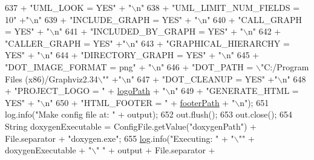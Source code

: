 \begin{DoxyCode}
637                     + \textcolor{stringliteral}{"UML\_LOOK = YES"} + \textcolor{stringliteral}{"\(\backslash\)n"}
638                     + \textcolor{stringliteral}{"UML\_LIMIT\_NUM\_FIELDS = 10"} +\textcolor{stringliteral}{"\(\backslash\)n"}
639                     + \textcolor{stringliteral}{"INCLUDE\_GRAPH = YES"} + \textcolor{stringliteral}{"\(\backslash\)n"}
640                     + \textcolor{stringliteral}{"CALL\_GRAPH = YES"} + \textcolor{stringliteral}{"\(\backslash\)n"}
641                     + \textcolor{stringliteral}{"INCLUDED\_BY\_GRAPH = YES"} + \textcolor{stringliteral}{"\(\backslash\)n"}
642                     + \textcolor{stringliteral}{"CALLER\_GRAPH = YES"} +\textcolor{stringliteral}{"\(\backslash\)n"}
643                     + \textcolor{stringliteral}{"GRAPHICAL\_HIERARCHY = YES"} + \textcolor{stringliteral}{"\(\backslash\)n"}
644                     + \textcolor{stringliteral}{"DIRECTORY\_GRAPH = YES"} + \textcolor{stringliteral}{"\(\backslash\)n"}
645                     + \textcolor{stringliteral}{"DOT\_IMAGE\_FORMAT = png"} + \textcolor{stringliteral}{"\(\backslash\)n"}
646                     + \textcolor{stringliteral}{"DOT\_PATH = \(\backslash\)"C:/Program Files (x86)/Graphviz2.34\(\backslash\)""} +\textcolor{stringliteral}{"\(\backslash\)n"}
647                     + \textcolor{stringliteral}{"DOT\_CLEANUP = YES"} +\textcolor{stringliteral}{"\(\backslash\)n"}
648                     + \textcolor{stringliteral}{"PROJECT\_LOGO = "} + \hyperlink{classit_1_1isislab_1_1masonassisteddocumentation_1_1mason_1_1analizer_1_1_global_utility_aeb806bda4a3b7b9099e2197bdca5cd75}{logoPath} + \textcolor{stringliteral}{"\(\backslash\)n"}
649                     + \textcolor{stringliteral}{"GENERATE\_HTML = YES"} + \textcolor{stringliteral}{"\(\backslash\)n"}
650                     + \textcolor{stringliteral}{"HTML\_FOOTER = "} + \hyperlink{classit_1_1isislab_1_1masonassisteddocumentation_1_1mason_1_1analizer_1_1_global_utility_ae94176856fb4ef24dfaa70423f5fc3f9}{footerPath} + \textcolor{stringliteral}{"\(\backslash\)n"});
651             log.info(\textcolor{stringliteral}{"Make config file at: "} + output);
652             out.flush();
653             out.close();
654             String doxygenExecutable = ConfigFile.getValue(\textcolor{stringliteral}{"doxygenPath"}) + File.separator + \textcolor{stringliteral}{"doxygen.exe"};
655             \hyperlink{classit_1_1isislab_1_1masonassisteddocumentation_1_1mason_1_1analizer_1_1_global_utility_afd0c78aa925e69d658bdd0ec85775ced}{log}.info(\textcolor{stringliteral}{"Executing: "} + \textcolor{stringliteral}{"\(\backslash\)""} + doxygenExecutable + \textcolor{stringliteral}{"\(\backslash\)" "} + output + File.separator + 

\end{DoxyCode}
